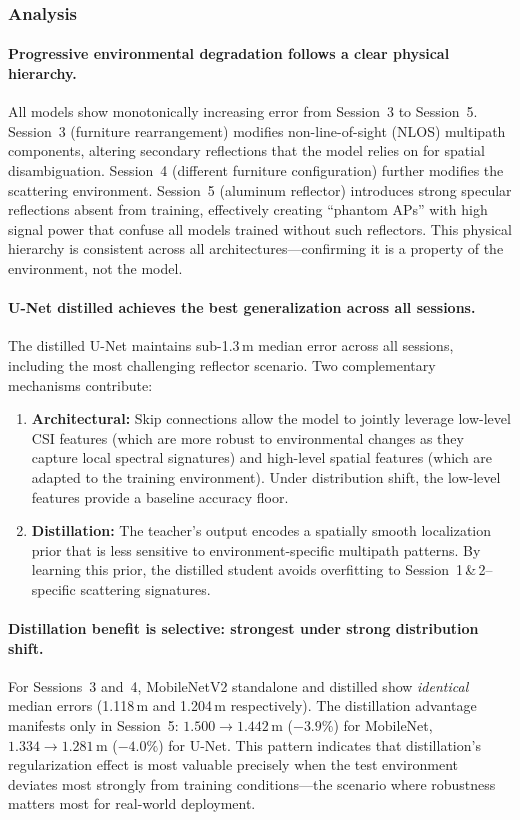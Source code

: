 \documentclass[11pt,a4paper]{article}
\begin{document}
\subsubsection{Analysis}

\paragraph{Progressive environmental degradation follows a clear physical hierarchy.}
All models show monotonically increasing error from Session~3 to Session~5.
Session~3 (furniture rearrangement) modifies non-line-of-sight (NLOS) multipath components, altering secondary reflections that the model relies on for spatial disambiguation.
Session~4 (different furniture configuration) further modifies the scattering environment.
Session~5 (aluminum reflector) introduces strong specular reflections absent from training, effectively creating ``phantom APs'' with high signal power that confuse all models trained without such reflectors.
This physical hierarchy is consistent across all architectures---confirming it is a property of the environment, not the model.

\paragraph{U-Net distilled achieves the best generalization across all sessions.}
The distilled U-Net maintains sub-1.3\,m median error across all sessions, including the most challenging reflector scenario.
Two complementary mechanisms contribute:
\begin{enumerate}[nosep]
  \item \textbf{Architectural:} Skip connections allow the model to jointly leverage low-level CSI features (which are more robust to environmental changes as they capture local spectral signatures) and high-level spatial features (which are adapted to the training environment). Under distribution shift, the low-level features provide a baseline accuracy floor.
  \item \textbf{Distillation:} The teacher's output encodes a spatially smooth localization prior that is less sensitive to environment-specific multipath patterns. By learning this prior, the distilled student avoids overfitting to Session~1\,\&\,2--specific scattering signatures.
\end{enumerate}

\paragraph{Distillation benefit is selective: strongest under strong distribution shift.}
For Sessions~3 and~4, MobileNetV2 standalone and distilled show \emph{identical} median errors (1.118\,m and 1.204\,m respectively).
The distillation advantage manifests only in Session~5: $1.500 \to 1.442$\,m ($-3.9\%$) for MobileNet, $1.334 \to 1.281$\,m ($-4.0\%$) for U-Net.
This pattern indicates that distillation's regularization effect is most valuable precisely when the test environment deviates most strongly from training conditions---the scenario where robustness matters most for real-world deployment.
\end{document}
